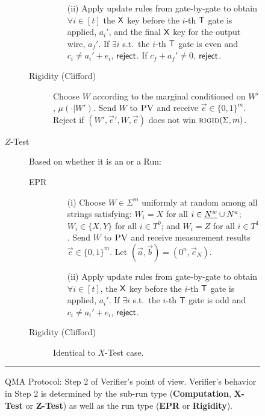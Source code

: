 \documentclass{toc}
\newcommand{\rigid}{\textsc{rigid}}
\newcommand{\pv}{\textsc{PV}}
\newcommand{\highlight}[1]{\uline{#1}}
\begin{document}
\begin{figure}[H]
\begin{description}
\begin{description}
\begin{enumerate}
		\item[(ii)] Apply update rules from  gate-by-gate to obtain $\forall i\in [t]$ the $\sf X$ key before the $i$-th $\sf T$ gate is applied, $a_i'$, and the final $\sf X$ key for the output wire, $a_f'$. 
If $\exists i$ s.t.\ the $i$-th $\sf T$ gate is even and $c_i\neq a_i'+e_i$, $\sf reject$. If $c_f+a_f'\neq 0$, $\sf reject$. 
	\end{enumerate}
	\item[Rigidity (Clifford)] Choose ${W}$ according to the marginal conditioned on ${W}'$, $\mu(\cdot|{W}')$. 
	Send ${W}$ to $\pv$ and receive $\vec{e}\in\{0,1\}^m$. Reject if   $({W}',\vec{e}',{W},\vec{e})$ does not win $\rigid(\Sigma,m)$. 
\end{description}

\item[$Z$-Test] Based on whether it is 
an  or a  Run:
\begin{description}
	\item[EPR] 
	\begin{enumerate}
		\item[(i)] Choose $W\in\Sigma^m$ uniformly at random among all strings
      satisfying: $W_i=X$ for all $i\in \highlight{N^w} \cup N^a$; $W_i\in\{X,Y\}$ for all $i\in T^0$; and $W_i=Z$ for all $i\in T^1$. Send $W$ to $\pv$ and receive measurement results $\vec{e}\in\{0,1\}^m$. Let $(\vec{a},\vec{b})=(0^n,\vec{e}_N)$.
		\item[(ii)] Apply update rules from  gate-by-gate to obtain $\forall i\in [t]$, the $\sf X$ key before the $i$-th $\sf T$ gate is applied, $a_i'$. 
If $\exists i$ s.t.\ the $i$-th $\sf T$ gate is odd and $c_i\neq a_i'+e_i$, $\sf reject$. 
	\end{enumerate}
	\item[Rigidity (Clifford)] Identical to $X$-Test case.
\end{description}
\end{description}
\rule[2ex]{\textwidth}{0.5pt}\vspace{-.5cm}
\caption{QMA Protocol: Step 2 of Verifier's point of view. Verifier's behavior in Step 2 is determined by the sub-run type (\textbf{Computation}, \textbf{X-Test} or \textbf{Z-Test}) as well as the run type (\textbf{EPR} or \textbf{Rigidity}).}\label{fig:qma-protocol-V-continued}
\end{figure}
\end{document}

